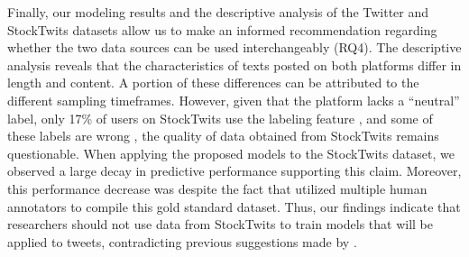 Finally, our modeling results and the descriptive analysis of the Twitter and StockTwits datasets allow us to make an informed recommendation regarding whether the two data sources can be used interchangeably (RQ4). The descriptive analysis reveals that the characteristics of texts posted on both platforms differ in length and content. A portion of these differences can be attributed to the different sampling timeframes. However, given that the platform lacks a ``neutral'' label, only 17\% of users on StockTwits use the labeling feature , and some of these labels are wrong , the quality of data obtained from StockTwits remains questionable. When applying the proposed models to the StockTwits dataset, we observed a large decay in predictive performance supporting this claim. Moreover, this performance decrease was despite the fact that  utilized multiple human annotators to compile this gold standard dataset. Thus, our findings indicate that researchers should not use data from StockTwits to train models that will be applied to tweets, contradicting previous suggestions made by .


